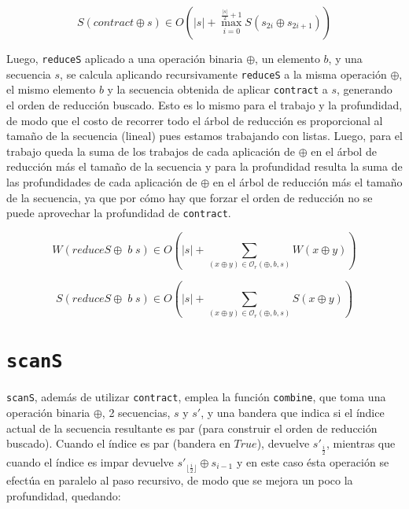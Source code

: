 \documentclass[a4paper,10pt]{article}
\begin{document}
\begin{equation*}
    S \left( contract \oplus s \right) \in
    O \left( \vert s \vert + \max_{i=0}^{\frac{\vert s \vert}{2} + 1} S \left( s_{2i} \oplus s_{2i+1} \right) \right)
\end{equation*}

Luego, \texttt{reduceS} aplicado a una operación binaria $\oplus$, un elemento $b$,
y una secuencia $s$, se calcula aplicando recursivamente \texttt{reduceS} a la
misma operación $\oplus$, el mismo elemento $b$ y la secuencia obtenida de aplicar
\texttt{contract} a $s$, generando el orden de reducción buscado. Esto es lo mismo
para el trabajo y la profundidad, de modo que el costo de recorrer todo el árbol
de reducción es proporcional al tamaño de la secuencia (lineal) pues estamos
trabajando con listas. Luego, para el trabajo queda la suma de los trabajos de
cada aplicación de $\oplus$ en el árbol de reducción más el tamaño de la secuencia y
para la profundidad resulta la suma de las profundidades de cada aplicación de
$\oplus$ en el árbol de reducción más el tamaño de la secuencia, ya que por cómo hay
que forzar el orden de reducción no se puede aprovechar la profundidad de \texttt{contract}.

\newpage

\begin{equation*}
    W \left( reduceS \oplus \; b \; s \right) \in
    O \left( \vert s \vert + \sum_{(x \oplus y) \in \mathcal{O}_r(\oplus,b,s)} W \left( x \oplus y \right) \right)
\end{equation*}

\begin{equation*}
    S \left( reduceS \oplus \; b \; s \right) \in
    O \left( \vert s \vert + \sum_{(x \oplus y) \in \mathcal{O}_r(\oplus,b,s)} S \left( x \oplus y \right) \right)
\end{equation*}

\section*{\texttt{scanS}}

\texttt{scanS}, además de utilizar \texttt{contract}, emplea la función \texttt{combine},
que toma una operación binaria $\oplus$, 2 secuencias, $s$ y $s'$, y una bandera
que indica si el índice actual de la secuencia resultante es par (para construir
el orden de reducción buscado). Cuando el índice es par (bandera en $True$),
devuelve $s'_{\frac{i}{2}}$, mientras que cuando el índice es impar devuelve
$s'_{\lfloor \frac{i}{2} \rfloor} \oplus s_{i-1}$ y en este caso ésta operación
se efectúa en paralelo al paso recursivo, de modo que se mejora un poco la
profundidad, quedando:
\end{document}

